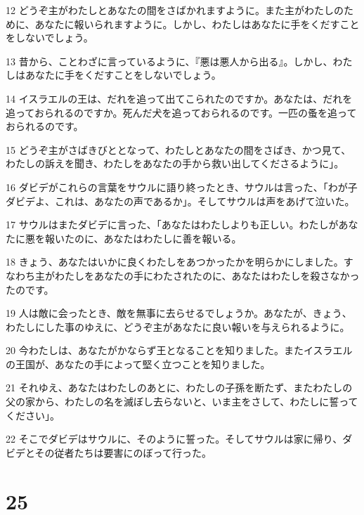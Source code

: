 \par 12 どうぞ主がわたしとあなたの間をさばかれますように。また主がわたしのために、あなたに報いられますように。しかし、わたしはあなたに手をくだすことをしないでしょう。
\par 13 昔から、ことわざに言っているように、『悪は悪人から出る』。しかし、わたしはあなたに手をくだすことをしないでしょう。
\par 14 イスラエルの王は、だれを追って出てこられたのですか。あなたは、だれを追っておられるのですか。死んだ犬を追っておられるのです。一匹の蚤を追っておられるのです。
\par 15 どうぞ主がさばきびととなって、わたしとあなたの間をさばき、かつ見て、わたしの訴えを聞き、わたしをあなたの手から救い出してくださるように」。
\par 16 ダビデがこれらの言葉をサウルに語り終ったとき、サウルは言った、「わが子ダビデよ、これは、あなたの声であるか」。そしてサウルは声をあげて泣いた。
\par 17 サウルはまたダビデに言った、「あなたはわたしよりも正しい。わたしがあなたに悪を報いたのに、あなたはわたしに善を報いる。
\par 18 きょう、あなたはいかに良くわたしをあつかったかを明らかにしました。すなわち主がわたしをあなたの手にわたされたのに、あなたはわたしを殺さなかったのです。
\par 19 人は敵に会ったとき、敵を無事に去らせるでしょうか。あなたが、きょう、わたしにした事のゆえに、どうぞ主があなたに良い報いを与えられるように。
\par 20 今わたしは、あなたがかならず王となることを知りました。またイスラエルの王国が、あなたの手によって堅く立つことを知りました。
\par 21 それゆえ、あなたはわたしのあとに、わたしの子孫を断たず、またわたしの父の家から、わたしの名を滅ぼし去らないと、いま主をさして、わたしに誓ってください」。
\par 22 そこでダビデはサウルに、そのように誓った。そしてサウルは家に帰り、ダビデとその従者たちは要害にのぼって行った。

\chapter{25}

